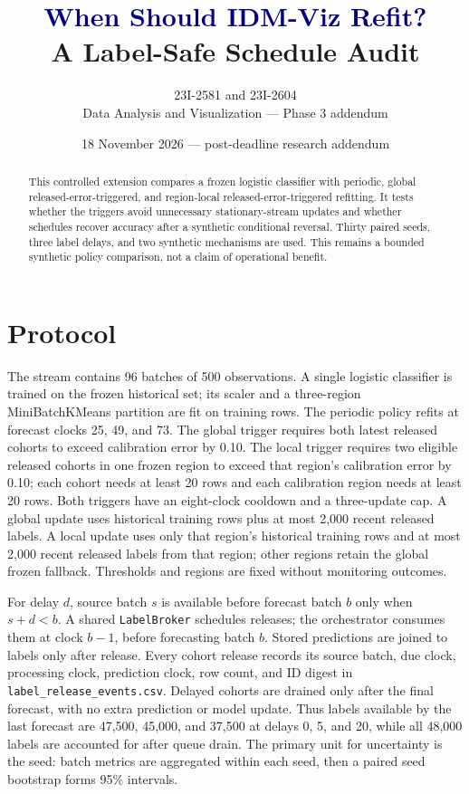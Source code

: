 \documentclass[10pt]{article}
\title{\textcolor{navy}{When Should IDM-Viz Refit?}\\[3pt]\large A Label-Safe Schedule Audit}
\author{23I-2581 and 23I-2604\\Data Analysis and Visualization --- Phase 3 addendum}
\date{18 November 2026 --- post-deadline research addendum}
\begin{document}
\maketitle
\begin{abstract}
This controlled extension compares a frozen logistic classifier with periodic, global released-error-triggered, and region-local released-error-triggered refitting. It tests whether the triggers avoid unnecessary stationary-stream updates and whether schedules recover accuracy after a synthetic conditional reversal. Thirty paired seeds, three label delays, and two synthetic mechanisms are used. This remains a bounded synthetic policy comparison, not a claim of operational benefit.
\end{abstract}
\section{Protocol}
The stream contains 96 batches of 500 observations. A single logistic classifier is trained on the frozen historical set; its scaler and a three-region MiniBatchKMeans partition are fit on training rows. The periodic policy refits at forecast clocks 25, 49, and 73. The global trigger requires both latest released cohorts to exceed calibration error by 0.10. The local trigger requires two eligible released cohorts in one frozen region to exceed that region's calibration error by 0.10; each cohort needs at least 20 rows and each calibration region needs at least 20 rows. Both triggers have an eight-clock cooldown and a three-update cap. A global update uses historical training rows plus at most 2,000 recent released labels. A local update uses only that region's historical training rows and at most 2,000 recent released labels from that region; other regions retain the global frozen fallback. Thresholds and regions are fixed without monitoring outcomes.

For delay $d$, source batch $s$ is available before forecast batch $b$ only when $s+d<b$. A shared \texttt{LabelBroker} schedules releases; the orchestrator consumes them at clock $b-1$, before forecasting batch $b$. Stored predictions are joined to labels only after release. Every cohort release records its source batch, due clock, processing clock, prediction clock, row count, and ID digest in \texttt{label\_release\_events.csv}. Delayed cohorts are drained only after the final forecast, with no extra prediction or model update. Thus labels available by the last forecast are 47,500, 45,000, and 37,500 at delays 0, 5, and 20, while all 48,000 labels are accounted for after queue drain. The primary unit for uncertainty is the seed: batch metrics are aggregated within each seed, then a paired seed bootstrap forms 95\% intervals.
\end{document}
